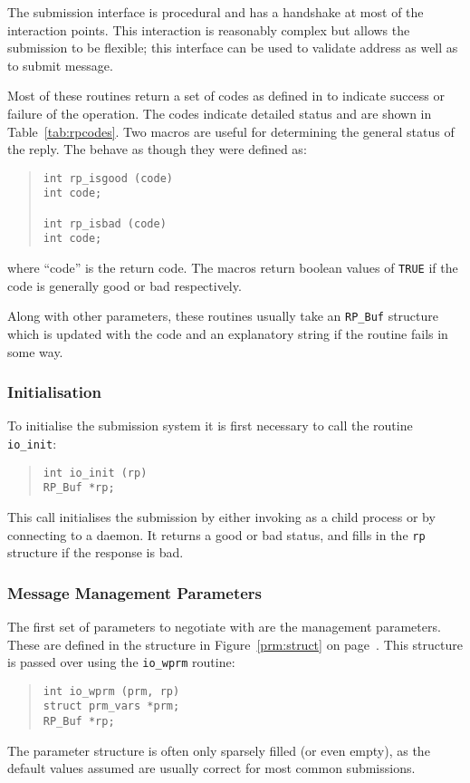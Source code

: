 The submission interface is procedural and has a handshake at most of
the interaction points. This interaction is reasonably complex but
allows the submission to be flexible; this interface can be used to
validate address as well as to submit message.

Most of these routines return a set of codes as defined in
 to indicate success or failure of the operation. The
codes indicate detailed status and are shown in
Table~\ref{tab:rpcodes}. Two macros are useful for determining the
general status of the reply. The behave as though they were defined as:
\begin{quote}\begin{verbatim}
int rp_isgood (code)
int code;

int rp_isbad (code)
int code;
\end{verbatim}\end{quote}
where ``code'' is the return code. The macros return boolean values of
\verb|TRUE| if the code is generally good or bad respectively.


Along with other parameters, these routines usually take an
\verb|RP_Buf| structure which is updated with the code
and an explanatory string if the routine fails in some way.

\subsubsection{Initialisation}

To initialise the submission system it is first necessary to call the
routine \verb|io_init|:
\begin{quote}\begin{verbatim}
int io_init (rp)
RP_Buf *rp;
\end{verbatim}\end{quote}
This call initialises the submission by either invoking 
as a child process or by connecting to a  daemon. It
returns a good or bad status, and fills in the \verb|rp| structure if
the response is bad.

\subsubsection{Message Management Parameters}

The first set of parameters to negotiate with  are the
management parameters. These are defined in the structure in
Figure~\ref{prm:struct} on page~\pageref{prm:struct}. This structure
is passed over using the \verb|io_wprm| routine:
\begin{quote}\begin{verbatim}
int io_wprm (prm, rp)
struct prm_vars *prm;
RP_Buf *rp;
\end{verbatim}\end{quote}
The parameter structure is often only sparsely filled (or even empty),
as the default values assumed are usually correct for most common
submissions.


